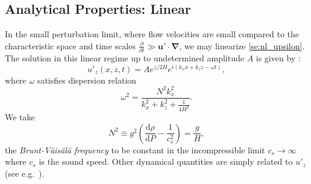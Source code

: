 \documentclass[
        fleqn,
        usenatbib,
    ]{mnras}
\newcommand*{\rd}[2]{\frac{\mathrm{d}#1}{\mathrm{d}#2}}
\newcommand*{\pd}[2]{\frac{\partial#1}{\partial#2}}
\newcommand*{\p}[1]{\left(#1\right)}
\newcommand*{\bm}[1]{\boldsymbol{\mathbf{#1}}}
\begin{document}
\subsection{Analytical Properties: Linear}

In the small perturbation limit, where flow velocities are small compared to the
characteristic space and time scales $\pd{}{t} \gg \bm{u}' \cdot
\bm{\nabla}$, we may linearize \autoref{se:nl_upsilon}. The solution in this
linear regime up to undetermined amplitude $A$ is given by
\citep{drazin,sutherland0}:
\begin{equation}
    u'_z\p{x, z, t} = Ae^{z/2H}e^{i\p{k_{x}x + k_{z}z - \omega t}},
        \label{eq:k0z_sign}
\end{equation}
where $\omega$ satisfies dispersion relation
\begin{equation}
    \omega^2 = \frac{N^2k_{x}^2}{k_{x}^2 + k_{z}^2 + \frac{1}{4H^2}}.
        \label{eq:disp_rel}
\end{equation}
We take
\begin{equation}
    N^2 \equiv g^2\p{\rd{\rho}{P} - \frac{1}{c_s^2}} = \frac{g}{H},
\end{equation}
the \emph{Brunt-V\"ais\"al\"a frequency} to be constant in the incompressible
limit $c_s \to \infty$ where $c_s$ is the sound speed. Other dynamical
quantities are simply related to $u'_z$ (see e.g.\ \cite{sutherland0}).
\end{document}
